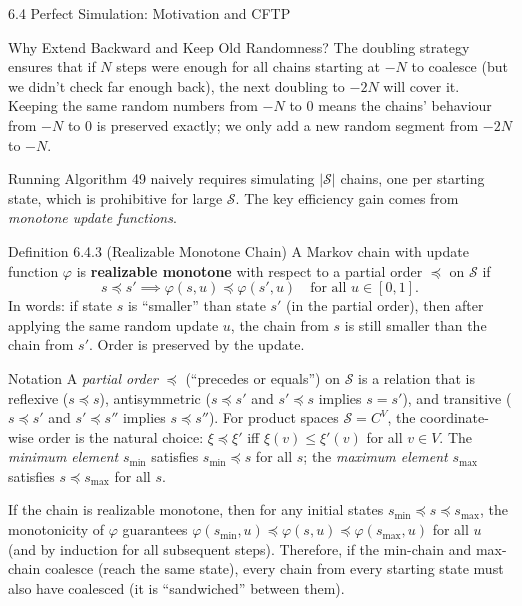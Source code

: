 \documentclass[aspectratio=169,10pt]{beamer}
\begin{document}
\begin{frame}[allowframebreaks]{6.4 Perfect Simulation: Motivation and CFTP}
\begin{alertblock}{Why Extend Backward and Keep Old Randomness?}
The doubling strategy ensures that if $N$ steps were enough for all chains starting at $-N$ to coalesce (but we didn't check far enough back), the next doubling to $-2N$ will cover it.
Keeping the same random numbers from $-N$ to $0$ means the chains' behaviour from $-N$ to $0$ is preserved exactly; we only add a new random segment from $-2N$ to $-N$.
\end{alertblock}

\framebreak

Running Algorithm 49 naively requires simulating $|\mathcal{S}|$ chains, one per starting state, which is prohibitive for large $\mathcal{S}$.
The key efficiency gain comes from \emph{monotone update functions}.

\begin{block}{Definition 6.4.3 (Realizable Monotone Chain)}
A Markov chain with update function $\varphi$ is \textbf{realizable monotone} with respect to a partial order $\preceq$ on $\mathcal{S}$ if
\[
  s \preceq s' \implies \varphi(s, u) \preceq \varphi(s', u) \quad \text{for all } u \in [0,1].
\]
In words: if state $s$ is ``smaller'' than state $s'$ (in the partial order), then after applying the same random update $u$, the chain from $s$ is still smaller than the chain from $s'$.
Order is preserved by the update.
\end{block}

\begin{block}{Notation}
A \emph{partial order} $\preceq$ (``precedes or equals'') on $\mathcal{S}$ is a relation that is reflexive ($s \preceq s$), antisymmetric ($s \preceq s'$ and $s' \preceq s$ implies $s = s'$), and transitive ($s \preceq s'$ and $s' \preceq s''$ implies $s \preceq s''$).
For product spaces $\mathcal{S} = C^V$, the coordinate-wise order is the natural choice: $\xi \preceq \xi'$ iff $\xi(v) \le \xi'(v)$ for all $v \in V$.
The \emph{minimum element} $s_{\min}$ satisfies $s_{\min} \preceq s$ for all $s$; the \emph{maximum element} $s_{\max}$ satisfies $s \preceq s_{\max}$ for all $s$.
\end{block}

If the chain is realizable monotone, then for any initial states $s_{\min} \preceq s \preceq s_{\max}$, the monotonicity of $\varphi$ guarantees
$\varphi(s_{\min}, u) \preceq \varphi(s, u) \preceq \varphi(s_{\max}, u)$
for all $u$ (and by induction for all subsequent steps).
Therefore, if the min-chain and max-chain coalesce (reach the same state), every chain from every starting state must also have coalesced (it is ``sandwiched'' between them).


\end{frame}
\end{document}
